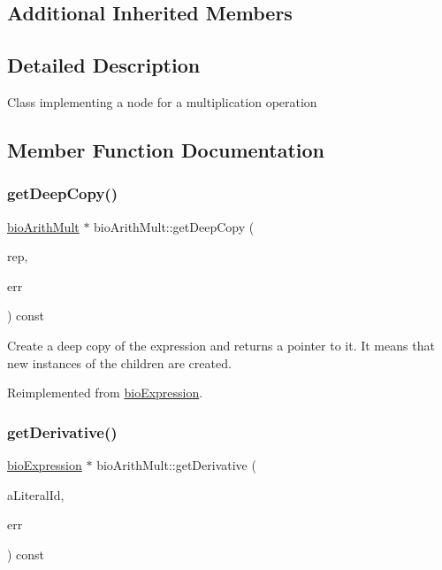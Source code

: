 \subsection*{Additional Inherited Members}


\subsection{Detailed Description}
Class implementing a node for a multiplication operation 

\subsection{Member Function Documentation}
\mbox{\label{classbio_arith_mult_a1b6b5a5ce5e104bf5a69010ad67ecd11}} 
\subsubsection{\texorpdfstring{get\+Deep\+Copy()}{getDeepCopy()}}
{\footnotesize\ttfamily \hyperlink{classbio_arith_mult}{bio\+Arith\+Mult} $\ast$ bio\+Arith\+Mult\+::get\+Deep\+Copy (\begin{DoxyParamCaption}\item[{\hyperlink{classbio_expression_repository}{bio\+Expression\+Repository} $\ast$}]{rep,  }\item[{pat\+Error $\ast$\&}]{err }\end{DoxyParamCaption}) const\hspace{0.3cm}{\ttfamily [virtual]}}

Create a deep copy of the expression and returns a pointer to it. It means that new instances of the children are created. 

Reimplemented from \hyperlink{classbio_expression_a4ee1b8add634078a02eaae26cd40dcc8}{bio\+Expression}.

\mbox{\label{classbio_arith_mult_a77183d650695b163328878a88fcb02a7}} 
\subsubsection{\texorpdfstring{get\+Derivative()}{getDerivative()}}
{\footnotesize\ttfamily \hyperlink{classbio_expression}{bio\+Expression} $\ast$ bio\+Arith\+Mult\+::get\+Derivative (\begin{DoxyParamCaption}\item[{pat\+U\+Long}]{a\+Literal\+Id,  }\item[{pat\+Error $\ast$\&}]{err }\end{DoxyParamCaption}) const\hspace{0.3cm}{\ttfamily [virtual]}}

